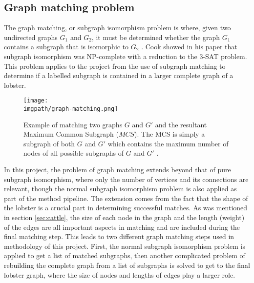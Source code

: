 \subsection{Graph matching problem}\label{sec:lit-graph}
The graph matching, or subgraph isomorphism problem is where, given two undirected graphs $G_1$ and $G_2$, it must be determined whether the graph $G_1$ contains a subgraph that is isomorphic to $G_2$ \cite{subgraph}. Cook showed in his paper that subgraph isomorphism was NP-complete with a reduction to the 3-SAT problem. This problem applies to the project from the use of subgraph matching to determine if a labelled subgraph is contained in a larger complete graph of a lobster. 
\begin{figure}[H]
\centering
\texttt{[image: \\imgpath/graph-matching.png]}
\caption{Example of matching two graphs $G$ and $G'$ and the resultant Maximum Common Subgraph ($MCS$). The MCS is simply a subgraph of both $G$ and $G'$ which contains the maximum number of nodes of all possible subgraphs of $G$ and $G'$ \cite{graph-matching}.}
\end{figure}
\noindent
In this project, the problem of graph matching extends beyond that of pure subgraph isomorphism, where only the number of vertices and its connections are relevant, though the normal subgraph isomorphism problem is also applied as part of the method pipeline. The extension comes from the fact that the shape of the lobster is a crucial part in determining successful matches. As was mentioned  in section \ref{sec:cattle}, the size of each node in the graph and the length (weight) of the edges are all important aspects in matching and are included during the final matching step. This leads to two different graph matching steps used in methodology of this project. First, the normal subgraph isomorphism problem is applied to get a list of matched subgraphs, then another complicated problem of rebuilding the complete graph from a list of subgraphs is solved to get to the final lobster graph, where the size of nodes and lengths of edges play a larger role.
